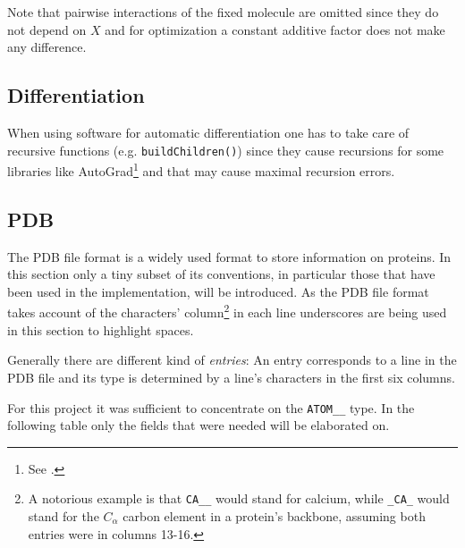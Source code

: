 \documentclass[12pt]{article}
\theoremstyle{definition}\newtheorem*{definition}{Definition}
\theoremstyle{definition}\newtheorem*{remark}{Remark}
\begin{document}
Note that pairwise interactions of the fixed molecule are omitted since they do not depend on $X$ and for optimization a constant additive factor does not make any difference.

\subsection{Differentiation}
When using software for automatic differentiation one has to take care of recursive functions (e.g. \texttt{buildChildren()}) since they cause recursions for some libraries like AutoGrad\footnote{See \cite{autograd}.} and that may cause maximal recursion errors.

\subsection{PDB}
The PDB file format is a widely used format to store information on proteins. In this section only a tiny subset of its conventions, in particular those that have been used in the implementation, will be introduced. As the PDB file format takes account of the characters' column\footnote{A notorious example is that \texttt{CA\_\_} would stand for calcium, while \texttt{\_CA\_} would stand for the $C_\alpha$ carbon element in a protein's backbone, assuming both entries were in columns 13-16.} in each line underscores are being used in this section to highlight spaces.

Generally there are different kind of \textit{entries}: An entry corresponds to a line in the PDB file and its type is determined by a line's characters in the first six columns.
 
For this project it was sufficient to concentrate on the \texttt{ATOM\_\_} type. In the following table only the fields that were needed will be elaborated on.
\end{document}

